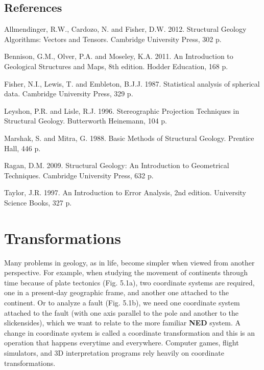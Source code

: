 \documentclass[a4paper , 12pt]{book}
\begin{document}
\section*{References}

Allmendinger, R.W., Cardozo, N. and Fisher, D.W. 2012. Structural Geology Algorithms: Vectors and Tensors. Cambridge University Press, 302 p.

Bennison, G.M., Olver, P.A. and Moseley, K.A. 2011. An Introduction to Geological Structures and Maps, 8th edition. Hodder Education, 168 p.

Fisher, N.I., Lewis, T. and Embleton, B.J.J. 1987. Statistical analysis of spherical data. Cambridge University Press, 329 p.

Leyshon, P.R. and Lisle, R.J. 1996. Stereographic Projection Techniques in Structural Geology. Butterworth Heinemann, 104 p.

Marshak, S. and Mitra, G. 1988. Basic Methods of Structural Geology. Prentice Hall, 446 p.

Ragan, D.M. 2009. Structural Geology: An Introduction to Geometrical Techniques. Cambridge University Press, 632 p.

Taylor, J.R. 1997. An Introduction to Error Analysis, 2nd edition. University Science Books, 327 p.

\chapter{Transformations}

Many problems in geology, as in life, become simpler when viewed from another perspective. For example, when studying the movement of continents through time because of plate tectonics (Fig. 5.1a), two coordinate systems are required, one in a present-day geographic frame, and another one attached to the continent. Or to analyze a fault (Fig. 5.1b), we need one coordinate system attached to the fault (with one axis parallel to the pole and another to the slickensides), which we want to relate to the more familiar \textbf{NED} system. A change in coordinate system is called a coordinate transformation and this is an operation that happens everytime and everywhere. Computer games, flight simulators, and 3D interpretation programs rely heavily on coordinate transformations. 
\end{document}
